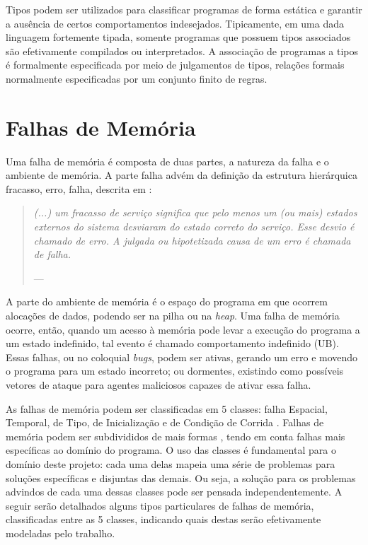 Tipos podem ser utilizados para classificar programas de forma estática e garantir a ausência de certos comportamentos indesejados. Tipicamente, em uma dada linguagem fortemente tipada, somente programas que possuem tipos associados são efetivamente compilados ou interpretados. A associação de programas a tipos é formalmente especificada por meio de julgamentos de tipos, relações formais normalmente especificadas por um conjunto finito de regras. %


\section{Falhas de Memória}
\label{sec:mem-error}

Uma falha de memória é composta de duas partes, a natureza da falha e o ambiente de memória. A parte falha advém da definição da estrutura hierárquica fracasso, erro, falha, descrita em \citet{FAULTS}: 
\begin{quotation}\textit{
	(...) um fracasso de serviço significa que pelo menos um (ou mais) estados externos do sistema desviaram do estado correto do serviço. Esse desvio é chamado de erro. A julgada ou hipotetizada causa de um erro é chamada de falha.}

	\hspace{1em plus 1fill}---\citet[p. 13, tradução nossa]{FAULTS}
\end{quotation}

A parte do ambiente de memória é o espaço do programa em que ocorrem alocações de dados, podendo ser na pilha ou na \emph{heap}. Uma falha de memória ocorre, então, quando um acesso à memória pode levar a execução do programa a um estado indefinido, tal evento é chamado comportamento indefinido (UB). Essas falhas, ou no coloquial \emph{bugs}, podem ser ativas, gerando um erro e movendo o programa para um estado incorreto; ou dormentes, existindo como possíveis vetores de ataque para agentes maliciosos capazes de ativar essa falha. 

As falhas de memória podem ser classificadas em 5 classes: falha Espacial, Temporal, de Tipo, de Inicialização e de Condição de Corrida \cite{Apple22,Google24}. Falhas de memória podem ser subdivididos de mais formas \cite{7KINGDOMS,CWELIST}, tendo em conta falhas mais específicas ao domínio do programa. O uso das classes é fundamental para o domínio deste projeto: cada uma delas mapeia uma série de problemas para soluções específicas e disjuntas das demais.  Ou seja, a solução para os problemas advindos de cada uma dessas classes pode ser pensada independentemente. A seguir serão detalhados alguns tipos particulares de falhas de memória, classificadas entre as 5 classes, indicando quais destas serão efetivamente modeladas pelo trabalho.

